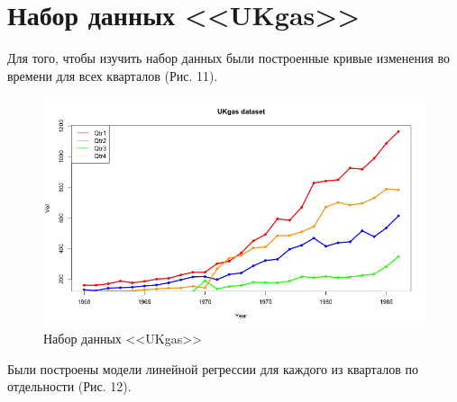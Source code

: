\documentclass[]{article}
\numberwithin{equation}{section}
\begin{document}
    \section{Набор данных <<UKgas>>}

    Для того, чтобы изучить набор данных были построенные кривые изменения во времени для всех кварталов (Рис. 11).

    \begin{figure}[H]
        \centering
        \includegraphics[width = 0.8\linewidth]{data/UKgas_qtr.png}
        \caption{Набор данных <<UKgas>>}
    \end{figure}
    Были построены модели линейной регрессии для каждого из кварталов по отдельности (Рис. 12).
\end{document}
